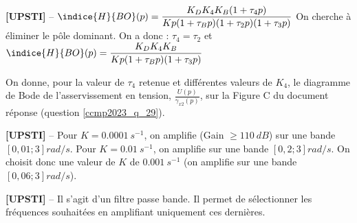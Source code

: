 \ifprof
\begin{corrige}%
\textbf{[UPSTI]} -- 
$\indice{H}{BO} (p)=\dfrac{K_D K_4 K_B (1+\tau_4 p)}{Kp(1+\tau_B p)(1+\tau_2 p)(1+\tau_3 p)}$
On cherche à éliminer le pôle dominant. On a donc : $\tau_4=\tau_2$ et  
$\indice{H}{BO} (p)=\dfrac{K_D K_4 K_B}{Kp(1+\tau_B p)(1+\tau_3 p)}$

\end{corrige}
\else
\fi

\ifprof
\else
On donne, pour la valeur de $\tau_{4}$ retenue et différentes valeurs de $K_{4}$, le diagramme de Bode de l'asservissement en tension, $\frac{U(p)}{\gamma_{x 2}(p)}$, sur la Figure C du document réponse (question \ref{ccmp2023_q_29}).
\fi

\ifprof
\begin{corrige}%
\textbf{[UPSTI]} --
Pour $K = \SI{0,0001}{s^{-1}}$, on amplifie (Gain $\geq \SI{110}{dB}$) sur une bande $\left[0,01 ; 3\right] \si{rad/s}$.
Pour $K = \SI{0,01}{s^{-1}}$, on amplifie sur une bande $\left[0,2 ; 3\right] \si{rad/s}$.
On choisit donc une valeur de $K$ de $\SI{0,001}{s^{-1}}$ (on amplifie sur une bande $\left[0,06 ; 3\right] \si{rad/s}$).

\end{corrige}
\else
\fi

\ifprof
\begin{corrige}%
\textbf{[UPSTI]} -- 
Il s’agit d’un filtre passe bande. Il permet de sélectionner les fréquences souhaitées en amplifiant uniquement ces dernières.
\end{corrige}
\else
\fi
